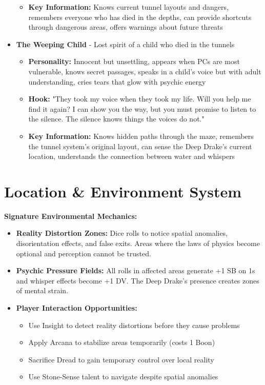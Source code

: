 \documentclass[11pt]{article}
\begin{document}
\begin{itemize}
\begin{itemize}
  \item \textbf{Key Information:} Knows current tunnel layouts and dangers, remembers everyone who has died in the depths, can provide shortcuts through dangerous areas, offers warnings about future threats
  \end{itemize}
\item \textbf{The Weeping Child} - Lost spirit of a child who died in the tunnels
  \begin{itemize}
  \item \textbf{Personality:} Innocent but unsettling, appears when PCs are most vulnerable, knows secret passages, speaks in a child's voice but with adult understanding, cries tears that glow with psychic energy
  \item \textbf{Hook:} "They took my voice when they took my life. Will you help me find it again? I can show you the way, but you must promise to listen to the silence. The silence knows things the voices do not."
  \item \textbf{Key Information:} Knows hidden paths through the maze, remembers the tunnel system's original layout, can sense the Deep Drake's current location, understands the connection between water and whispers
  \end{itemize}
\end{itemize}

\section{Location \& Environment System}

\textbf{Signature Environmental Mechanics:}
\begin{itemize}
\item \textbf{Reality Distortion Zones:} Dice rolls to notice spatial anomalies, disorientation effects, and false exits. Areas where the laws of physics become optional and perception cannot be trusted.
\item \textbf{Psychic Pressure Fields:} All rolls in affected areas generate +1 SB on 1s and whisper effects become +1 DV. The Deep Drake's presence creates zones of mental strain.
\item \textbf{Player Interaction Opportunities:}
  \begin{itemize}
  \item Use Insight to detect reality distortions before they cause problems
  \item Apply Arcana to stabilize areas temporarily (costs 1 Boon)
  \item Sacrifice Dread to gain temporary control over local reality
  \item Use Stone-Sense talent to navigate despite spatial anomalies
  \end{itemize}
\end{itemize}
\end{document}
